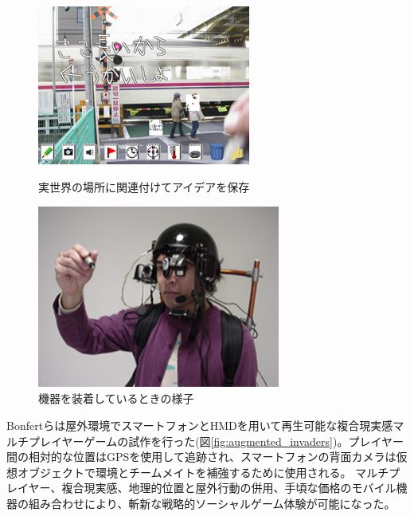 \documentclass[11pt,a4j, titlepage]{jarticle} %
\begin{document}
\begin{figure}[H]
  \begin{center}
    \includegraphics[clip,height=6.0cm,width=7.0cm]{./informal.eps}
    \caption{実世界の場所に関連付けてアイデアを保存}
    \label{fig:informal}
  \end{center}
\end{figure}

\begin{figure}[H]
  \begin{center}
    \includegraphics[clip,height=6.0cm,width=8.0cm]{./informal2.eps}
    \caption{機器を装着しているときの様子}
    \label{fig:informal2}
  \end{center}
\end{figure}

Bonfertら\cite{bonfert}は屋外環境でスマートフォンとHMDを用いて再生可能な複合現実感マルチプレイヤーゲームの試作を行った(図\ref{fig:augmented_invaders})。プレイヤー間の相対的な位置はGPSを使用して追跡され、スマートフォンの背面カメラは仮想オブジェクトで環境とチームメイトを補強するために使用される。 マルチプレイヤー、複合現実感、地理的位置と屋外行動の併用、手頃な価格のモバイル機器の組み合わせにより、斬新な戦略的ソーシャルゲーム体験が可能になった。
\end{document}
